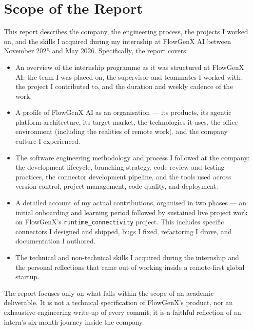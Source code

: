 \section{Scope of the Report}
This report describes the company, the engineering process, the
projects I worked on, and the skills I acquired during my internship at
FlowGenX AI between November 2025 and May 2026. Specifically, the
report covers:

\begin{itemize}[leftmargin=*]
    \item An overview of the internship programme as it was structured
    at FlowGenX AI: the team I was placed on, the supervisor and
    teammates I worked with, the project I contributed to, and the
    duration and weekly cadence of the work.

    \item A profile of FlowGenX AI as an organisation --- its products,
    its agentic platform architecture, its target market, the
    technologies it uses, the office environment (including the
    realities of remote work), and the company culture I experienced.

    \item The software engineering methodology and process I followed
    at the company: the development lifecycle, branching strategy,
    code review and testing practices, the connector development
    pipeline, and the tools used across version control, project
    management, code quality, and deployment.

    \item A detailed account of my actual contributions, organised in
    two phases --- an initial onboarding and learning period followed
    by sustained live project work on FlowGenX's
    \texttt{runtime\_connectivity} project. This includes specific
    connectors I designed and shipped, bugs I fixed, refactoring I
    drove, and documentation I authored.

    \item The technical and non-technical skills I acquired during the
    internship and the personal reflections that came out of working
    inside a remote-first global startup.
\end{itemize}

The report focuses only on what falls within the scope of an academic
deliverable. It is not a technical specification of FlowGenX's product,
nor an exhaustive engineering write-up of every commit; it is a faithful
reflection of an intern's six-month journey inside the company.


